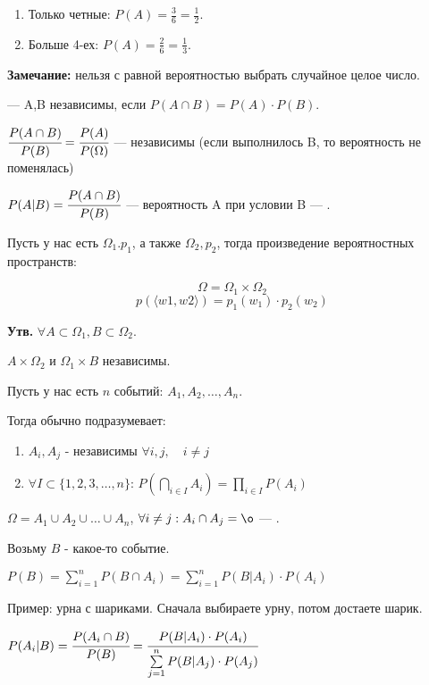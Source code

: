 \begin{enumerate}
\item Только четные: $P(A) = \frac{3}{6}=\frac{1}{2}$.
\item Больше 4-ех: $P(A) = \frac{2}{6}=\frac{1}{3}$.
\end{enumerate}

\textbf{Замечание:} нельзя с равной вероятностью выбрать случайное целое число. 

 --- A,B независимы, если $P(A \cap B) = P(A) \cdot P(B)$.

$\cfrac{P(A \cap B)}{ P(B)}  = \cfrac{P(A)}{P(\Omega)}$ --- независимы (если выполнилось B, то вероятность не поменялась)

$P(A | B) = \cfrac{P(A \cap B)}{P(B)}$ --- вероятность A при условии B ---
.


Пусть у нас есть $\Omega_1. p_1$, а также $\Omega_2,p_2$, тогда произведение вероятностных пространств:

\[\Omega = \Omega_1 \times \Omega_2\] \[p(\langle w1,w2\rangle) = p_1(w_1) \cdot p_2(w_2)\]

\textbf{Утв.} $\forall A \subset \Omega_1, B \subset \Omega_2$.

$A \times \Omega_2$ и $\Omega_1 \times B$  независимы.

Пусть у нас есть $n$ событий: $A_1, A_2, \ldots, A_n$.

Тогда обычно  подразумевает:

\begin{enumerate}
    \item $A_i, A_j $ - независимы $\forall i,j, \quad i \ne j$
    \item $\forall I \subset \{1,2,3,\ldots, n\}$: $P(\bigcap\limits_{i \in I }A_i) = \prod\limits_{i \in I} P(A_i)$
\end{enumerate}


$\Omega = A_1 \cup A_2 \cup \ldots \cup A_n $, $\forall i \neq j: A_i \cap A_j = \o$ --- .

Возьму $B$ - какое-то событие.

$P(B) = \sum\limits_{i=1}^n P(B \cap A_i) =  \sum\limits_{i=1}^n P(B| A_i) \cdot P(A_i)$

Пример: урна с шариками. Сначала выбираете урну, потом достаете шарик.


$P(A_i | B) = \cfrac{P(A_i\cap B)}{P(B)} = \cfrac{P(B| A_i) \cdot P(A_i)}{\sum\limits_{j=1}^n P(B| A_j) \cdot P(A_j)}$

